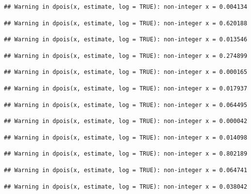 \documentclass[]{article}
\begin{document}
\begin{verbatim}
## Warning in dpois(x, estimate, log = TRUE): non-integer x = 0.004134
\end{verbatim}

\begin{verbatim}
## Warning in dpois(x, estimate, log = TRUE): non-integer x = 0.620188
\end{verbatim}

\begin{verbatim}
## Warning in dpois(x, estimate, log = TRUE): non-integer x = 0.013546
\end{verbatim}

\begin{verbatim}
## Warning in dpois(x, estimate, log = TRUE): non-integer x = 0.274899
\end{verbatim}

\begin{verbatim}
## Warning in dpois(x, estimate, log = TRUE): non-integer x = 0.000165
\end{verbatim}

\begin{verbatim}
## Warning in dpois(x, estimate, log = TRUE): non-integer x = 0.017937
\end{verbatim}

\begin{verbatim}
## Warning in dpois(x, estimate, log = TRUE): non-integer x = 0.064495
\end{verbatim}

\begin{verbatim}
## Warning in dpois(x, estimate, log = TRUE): non-integer x = 0.000042
\end{verbatim}

\begin{verbatim}
## Warning in dpois(x, estimate, log = TRUE): non-integer x = 0.014098
\end{verbatim}

\begin{verbatim}
## Warning in dpois(x, estimate, log = TRUE): non-integer x = 0.802189
\end{verbatim}

\begin{verbatim}
## Warning in dpois(x, estimate, log = TRUE): non-integer x = 0.064741
\end{verbatim}

\begin{verbatim}
## Warning in dpois(x, estimate, log = TRUE): non-integer x = 0.038042
\end{verbatim}
\end{document}
